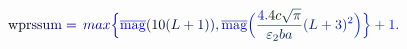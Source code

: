 \documentclass[12pt]{article}
\begin{document}
\makeatletter
\renewcommand*{\@textcolor}[3]{%
  \protect\leavevmode
  \begingroup
    \color#1{#2}#3%
  \endgroup
}
\makeatother
\begin{displaymath}
\mathrm { \mathcolor[RGB]{0,0,15}{w} \mathcolor[RGB]{0,0,30}{p} \mathcolor[RGB]{0,0,45}{r} \mathcolor[RGB]{0,0,60}{s} \mathcolor[RGB]{0,0,75}{s} \mathcolor[RGB]{0,0,90}{u} \mathcolor[RGB]{0,0,105}{m} } \mathcolor[RGB]{0,0,120}{=} \mathcolor[RGB]{0,0,135}{\operatorname*} { \mathcolor[RGB]{0,0,150}{m} \mathcolor[RGB]{0,0,165}{a} \mathcolor[RGB]{0,0,180}{x} } \mathcolor[RGB]{0,0,195}{\Bigl\{} \mathcolor[RGB]{0,0,210}{\overline { { \mathrm { \mathcolor[RGB]{0,0,225}{m} \mathcolor[RGB]{0,0,240}{a} \mathcolor[RGB]{0,0,255}{g} } } } } \mathcolor[RGB]{0,15,0}{(} \mathcolor[RGB]{0,15,15}{1} \mathcolor[RGB]{0,15,30}{0} \mathcolor[RGB]{0,15,45}{(} \mathcolor[RGB]{0,15,60}{L} \mathcolor[RGB]{0,15,75}{+} \mathcolor[RGB]{0,15,90}{1} \mathcolor[RGB]{0,15,105}{)} \mathcolor[RGB]{0,15,120}{)} \mathcolor[RGB]{0,15,135}{,} \mathcolor[RGB]{0,15,150}{\overline { { \mathrm { \mathcolor[RGB]{0,15,165}{m} \mathcolor[RGB]{0,15,180}{a} \mathcolor[RGB]{0,15,195}{g} } } } } \mathcolor[RGB]{0,15,210}{\Bigl(} \mathcolor[RGB]{0,15,225}{\frac { \mathcolor[RGB]{0,15,240}{4} \mathcolor[RGB]{0,15,255}{.} \mathcolor[RGB]{0,30,0}{4} \mathcolor[RGB]{0,30,15}{c} \mathcolor[RGB]{0,30,30}{\sqrt { \mathcolor[RGB]{0,30,45}{\pi} } } } { \mathcolor[RGB]{0,30,60}{\varepsilon} _ { \mathcolor[RGB]{0,30,75}{2} } \mathcolor[RGB]{0,30,90}{b} \mathcolor[RGB]{0,30,105}{a} } } \mathcolor[RGB]{0,30,120}{(} \mathcolor[RGB]{0,30,135}{L} \mathcolor[RGB]{0,30,150}{+} \mathcolor[RGB]{0,30,165}{3} \mathcolor[RGB]{0,30,180}{)} ^ { \mathcolor[RGB]{0,30,195}{2} } \mathcolor[RGB]{0,30,210}{\Bigr)} \mathcolor[RGB]{0,30,225}{\Bigr\}} \mathcolor[RGB]{0,30,240}{+} \mathcolor[RGB]{0,30,255}{1} \mathcolor[RGB]{0,45,0}{.}
\end{displaymath}
\end{document}
